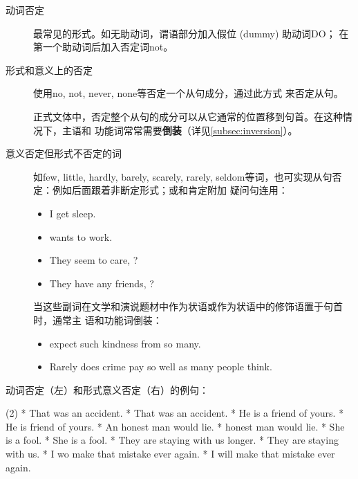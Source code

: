 \begin{description}
\item[动词否定] 最常见的形式。如无助动词，谓语部分加入假位 (dummy) 助动词DO；
  在第一个助动词后加入否定词not。

\item[形式和意义上的否定] 使用no, not, never, none等否定一个从句成分，通过此方式
  来否定从句。

  正式文体中，否定整个从句的成分可以从它通常的位置移到句首。在这种情况下，主语和
  功能词常常需要\textbf{倒装}（详见\cref{subsec:inversion}）。

\item[意义否定但形式不否定的词] 如few, little, hardly, barely, scarely,
  rarely, seldom等词，也可实现从句否定：例如后面跟着非断定形式；或和肯定附加
  疑问句连用：
  \begin{itemize}
  \item I  get  sleep.

  \item {} wants to work.

  \item They  seem to care, ?

  \item They  have any friends, ?
  \end{itemize}

  当这些副词在文学和演说题材中作为状语或作为状语中的修饰语置于句首时，通常主
  语和功能词倒装：
  \begin{itemize}
  \item {} expect such kindness from so many.

  \item Rarely does crime pay so well as many people think.
  \end{itemize}
\end{description}

动词否定（左）和形式意义否定（右）的例句：
\begin{taskitem}(2)
  * That was  an accident.
  * That was  an accident.
  * He is  a friend of yours.
  * He is  friend of yours.
  * An honest man would  lie.
  *  honest man would lie.
  * She is a fool.
  * She is  a fool.
  * They are  staying with us  longer.
  * They are  staying with us.
  * I wo make that mistake ever again.
  * I will  make that mistake ever again.
\end{taskitem}

